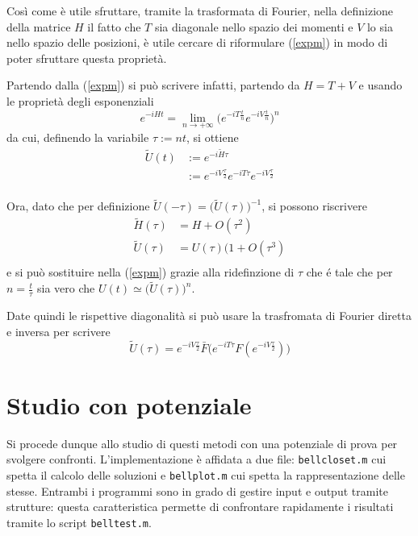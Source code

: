 \documentclass[a4paper,11pt,twoside,twocolumn]{article}
\begin{document}
Così come è utile sfruttare, tramite la trasformata di Fourier, nella definizione della matrice \(H\) il fatto che \(T\) sia diagonale nello spazio dei momenti e \(V\) lo sia nello spazio delle posizioni, è utile cercare di riformulare (\ref{expm}) in modo di poter sfruttare questa proprietà.

Partendo dalla (\ref{expm}) si può scrivere infatti, partendo da \(H=T+V\) e usando le proprietà degli esponenziali
\begin{equation}
    e^{-iHt}=\lim_{n \to + \infty} \Bigg( e^{-iT\frac{t}{n}}e^{-iV\frac{t}{n}}\Bigg)^n
\end{equation}
da cui, definendo la variabile \( \tau := nt \), si ottiene
\begin{equation}
    \begin{aligned}
        \tilde{U}(t) &:= e^{-i\tilde{H}\tau} \\
                     &:= e^{-iV\frac{\tau}{2}} e^{-iT\tau} e^{-iV\frac{\tau}{2}} \\
    \end{aligned}
\end{equation}

Ora, dato che per definizione \(\tilde{U}(-\tau)=\big(\tilde{U}(\tau)\big)^{-1}\), si possono riscrivere 
\begin{align*}
    \tilde{H}(\tau)&=H+O(\tau^2)\\
    \tilde{U}(\tau)&=U(\tau)(1+O(\tau^3)\\
\end{align*}
e si può sostituire nella (\ref{expm}) grazie alla ridefinzione di \(\tau\) che é tale che per \(n=\frac{t}{\tau}\) sia vero che \(U(t)\simeq\big(\tilde{U}(\tau)\big)^n\).

Date quindi le rispettive diagonalità si può usare la trasfromata di Fourier diretta e inversa per scrivere
\begin{equation}
    \tilde{U}(\tau)=e^{-iV\frac{\tau}{2}}\bar{F}\bigg(e^{-iT\tau}F(e^{-iV\frac{\tau}{2}})\bigg)
\end{equation}

\section{Studio con potenziale}
Si procede dunque allo studio di questi metodi con una potenziale di prova per svolgere confronti. L'implementazione è affidata a due file: \verb|bellcloset.m| cui spetta il calcolo delle soluzioni e \verb|bellplot.m| cui spetta la rappresentazione delle stesse. Entrambi i programmi sono in grado di gestire input e output tramite strutture: questa caratteristica permette di confrontare rapidamente i risultati tramite lo script \verb|belltest.m|.
\end{document}
